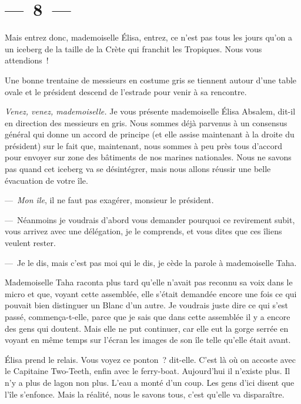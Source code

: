 \documentclass[french,twoside]{book} %
\begin{document}
\section[{— 8 —}]{— 8 —}
\renewcommand{\leftmark}{— 8 —}

\noindent Mais entrez donc, mademoiselle Élisa, entrez, ce n’est pas tous les jours qu’on a un iceberg de la taille de la Crète qui franchit les Tropiques. Nous vous attendions !\par
Une bonne trentaine de messieurs en costume gris se tiennent autour d’une table ovale et le président descend de l’estrade pour venir à sa rencontre.\par
\emph{Venez, venez, mademoiselle.} Je vous présente mademoi­selle Élisa Absalem, dit-il en direction des messieurs en gris. Nous sommes déjà parvenus à un consensus général qui donne un accord de principe (et elle assise maintenant à la droite du président) sur le fait que, maintenant, nous sommes à peu près tous d’accord pour envoyer sur zone des bâtiments de nos marines nationales. Nous ne savons pas quand cet iceberg va se désintégrer, mais nous allons réussir une belle évacuation de votre île.\par
— \emph{Mon île}, il ne faut pas exagérer, monsieur le président.\par
— Néanmoins je voudrais d’abord vous demander pourquoi ce revire­ment subit, vous arrivez avec une délégation, je le comprends, et vous dites que ces îliens veulent rester.\par
— Je le dis, mais c’est pas moi qui le dis, je cède la parole à mademoi­selle Taha.\par
\bigbreak
\noindent Mademoiselle Taha raconta plus tard qu’elle n’avait pas reconnu sa voix dans le micro et que, voyant cette assemblée, elle s’était demandée encore une fois ce qui pouvait bien distinguer un Blanc d’un autre. Je voudrais juste dire ce qui s’est passé, commença-t-elle, parce que je sais que dans cette assemblée il y a encore des gens qui doutent. Mais elle ne put continuer, car elle eut la gorge serrée en voyant en même temps sur l’écran les images de son île telle qu’elle était avant.\par
Élisa prend le relais. Vous voyez ce ponton ? dit-elle. C’est là où on accoste avec le Capitaine Two-Teeth, enfin avec le ferry-boat. Aujourd’hui il n’existe plus. Il n’y a plus de lagon non plus. L’eau a monté d’un coup. Les gens d’ici disent que l’île s’enfonce. Mais la réalité, nous le savons tous, c’est qu’elle va disparaître.\par
\end{document}
